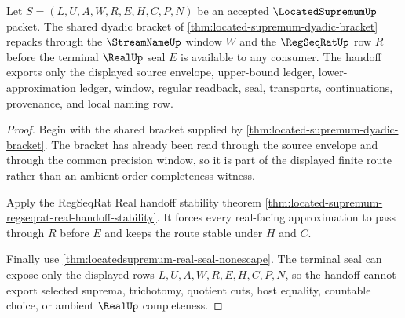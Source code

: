 \begin{theorem}
\label{thm:located-supremum-regseqrat-handoff}
Let $S=(L,U,A,W,R,E,H,C,P,N)$ be an accepted $\LocatedSupremumUp$ packet. The shared dyadic bracket of \autoref{thm:located-supremum-dyadic-bracket} repacks through the $\StreamNameUp$ window $W$ and the $\RegSeqRatUp$ row $R$ before the terminal $\RealUp$ seal $E$ is available to any consumer. The handoff exports only the displayed source envelope, upper-bound ledger, lower-approximation ledger, window, regular readback, seal, transports, continuations, provenance, and local naming row.
\end{theorem}
\begin{proof}
Begin with the shared bracket supplied by \autoref{thm:located-supremum-dyadic-bracket}. The bracket has already been read through the source envelope and through the common precision window, so it is part of the displayed finite route rather than an ambient order-completeness witness.

Apply the RegSeqRat Real handoff stability theorem \autoref{thm:located-supremum-regseqrat-real-handoff-stability}. It forces every real-facing approximation to pass through $R$ before $E$ and keeps the route stable under $H$ and $C$.

Finally use \autoref{thm:locatedsupremum-real-seal-nonescape}. The terminal seal can expose only the displayed rows $L,U,A,W,R,E,H,C,P,N$, so the handoff cannot export selected suprema, trichotomy, quotient cuts, host equality, countable choice, or ambient $\RealUp$ completeness.
\end{proof}

